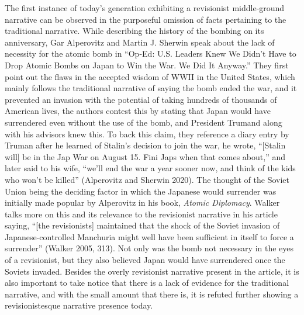 \documentclass[12pt]{turabian-researchpaper}
\begin{document}
The first instance of today’s generation exhibiting a revisionist middle-ground narrative can be observed in the purposeful omission of facts pertaining to the traditional narrative. While describing the history of the bombing on its anniversary, Gar Alperovitz and Martin J. Sherwin speak about the lack of necessity for the atomic bomb in “Op-Ed: U.S. Leaders Knew We Didn’t Have to Drop Atomic Bombs on Japan to Win the War. We Did It Anyway.” They first point out the flaws in the accepted wisdom of WWII in the United States, which mainly follows the traditional narrative of saying the bomb ended the war, and it prevented an invasion with the potential of taking hundreds of thousands of American lives, the authors contest this by stating that Japan would have surrendered even without the use of the bomb, and President Trumand along with his advisors knew this. To back this claim, they reference a diary entry by Truman after he learned of Stalin’s decision to join the war, he wrote, “[Stalin will] be in the Jap War on August 15. Fini Japs when that comes about,” and later said to his wife, “we’ll end the war a year sooner now, and think of the kids who won’t be killed” (Alperovitz and Sherwin 2020). The thought of the Soviet Union being the deciding factor in which the Japanese would surrender was initially made popular by Alperovitz in his book, \textit{Atomic Diplomacy}. Walker talks more on this and its relevance to the revisionist narrative in his article saying, “[the revisionists] maintained that the shock of the Soviet invasion of Japanese-controlled Manchuria might well have been sufficient in itself to force a surrender” (Walker 2005, 313). Not only was the bomb not necessary in the eyes of a revisionist, but they also believed Japan would have surrendered once the Soviets invaded. Besides the overly revisionist narrative present in the article, it is also important to take notice that there is a lack of evidence for the traditional narrative, and with the small amount that there is, it is refuted further showing a revisionistesque narrative presence today.
\end{document}
